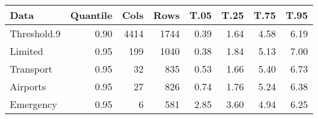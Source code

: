\begin{tabular}{lrrrrrrr}
  \hline
Data & Quantile & Cols & Rows & T.05 & T.25 & T.75 & T.95 \\ 
  \hline
Threshold.9 & 0.90 & 4414 & 1744 & 0.39 & 1.64 & 4.58 & 6.19 \\ 
  Limited & 0.95 & 199 & 1040 & 0.38 & 1.84 & 5.13 & 7.00 \\ 
  Transport & 0.95 & 32 & 835 & 0.53 & 1.66 & 5.40 & 6.73 \\ 
  Airports & 0.95 & 27 & 826 & 0.74 & 1.76 & 5.24 & 6.38 \\ 
  Emergency & 0.95 & 6 & 581 & 2.85 & 3.60 & 4.94 & 6.25 \\ 
   \hline
\end{tabular}
